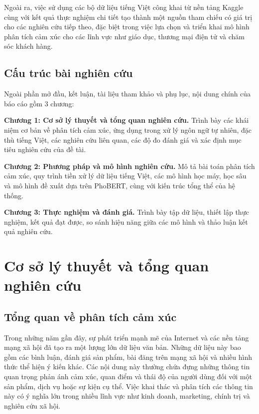 \documentclass[14pt, a4paper]{report}
\begin{document}
Ngoài ra, việc sử dụng các bộ dữ liệu tiếng Việt công khai từ nền tảng Kaggle cùng với kết quả thực nghiệm chi tiết tạo thành một nguồn tham chiếu có giá trị cho các nghiên cứu tiếp theo, đặc biệt trong việc lựa chọn và triển khai mô hình phân tích cảm xúc cho các lĩnh vực như giáo dục, thương mại điện tử và chăm sóc khách hàng.

\section{Cấu trúc bài nghiên cứu}

Ngoài phần mở đầu, kết luận, tài liệu tham khảo và phụ lục, nội dung chính của báo cáo gồm 3 chương:

\textbf{Chương 1: Cơ sở lý thuyết và tổng quan nghiên cứu.} Trình bày các khái niệm cơ bản về phân tích cảm xúc, ứng dụng trong xử lý ngôn ngữ tự nhiên, đặc thù tiếng Việt, các nghiên cứu liên quan, các độ đo đánh giá và xác định mục tiêu nghiên cứu của đề tài.

\textbf{Chương 2: Phương pháp và mô hình nghiên cứu.} Mô tả bài toán phân tích cảm xúc, quy trình tiền xử lý dữ liệu tiếng Việt, các mô hình học máy, học sâu và mô hình đề xuất dựa trên PhoBERT, cùng với kiến trúc tổng thể của hệ thống.

\textbf{Chương 3: Thực nghiệm và đánh giá.} Trình bày tập dữ liệu, thiết lập thực nghiệm, kết quả đạt được, so sánh hiệu năng giữa các mô hình và thảo luận kết quả nghiên cứu.

\newpage

\renewcommand{\thesection}{\thechapter.\arabic{section}}
\renewcommand{\thesubsection}{\thechapter.\arabic{section}.\arabic{subsection}}
\renewcommand{\thesubsubsection}{\thechapter.\arabic{section}.\arabic{subsection}.\arabic{subsubsection}}

\chapter{Cơ sở lý thuyết và tổng quan nghiên cứu}
\label{chap:chapter1}

\section{Tổng quan về phân tích cảm xúc}

Trong những năm gần đây, sự phát triển mạnh mẽ của Internet và các nền tảng mạng xã hội đã tạo ra một lượng lớn dữ liệu văn bản. Những dữ liệu này bao gồm các bình luận, đánh giá sản phẩm, bài đăng trên mạng xã hội và nhiều hình thức thể hiện ý kiến khác. Các nội dung này thường chứa đựng những thông tin quan trọng phản ánh cảm xúc, quan điểm và thái độ của người dùng đối với một sản phẩm, dịch vụ hoặc sự kiện cụ thể. Việc khai thác và phân tích các thông tin này có ý nghĩa lớn trong nhiều lĩnh vực như kinh doanh, marketing, chính trị và nghiên cứu xã hội.
\end{document}
